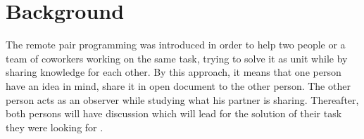 \section{Background}

The remote pair programming was introduced in order to help two people or a team of coworkers working on the same task, trying to solve it as unit while  by sharing knowledge for each other. By this approach, it means that one person have an idea in mind, share it in open document to the other person. The other person acts as an observer while studying what his partner is sharing. Thereafter, both persons will have discussion which will lead for the solution of their task they were looking for \cite{pairpro}. 
